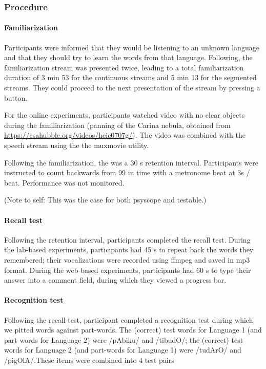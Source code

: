 \documentclass[]{article}
\let\oldparagraph\paragraph
\renewcommand{\paragraph}[1]{\oldparagraph{#1}\mbox{}}
\begin{document}
\subsubsection{Procedure}\label{procedure-1}

\paragraph{Familiarization}\label{familiarization}

Participants were informed that they would be listening to an unknown
language and that they should try to learn the words from that language.
Following, the familiarization stream was presented twice, leading to a
total familiarization duration of 3 min 53 for the continuous streams
and 5 min 13 for the segmented streams. They could proceed to the next
presentation of the stream by pressing a button.

For the online experiments, participants watched video with no clear
objects during the familiarization (panning of the Carina nebula,
obtained from \url{https://esahubble.org/videos/heic0707g/}). The video
was combined with the speech stream using the the muxmovie utility.

Following the familiarization, the was a 30 s retention interval.
Participants were instructed to count backwards from 99 in time with a
metronome beat at 3s / beat. Performance was not monitored.

(Note to self: This was the case for both psyscope and testable.)

\paragraph{Recall test}\label{recall-test}

Following the retention interval, participants completed the recall
test. During the lab-based experiments, participants had 45 s to repeat
back the words they remembered; their vocalizations were recorded using
ffmpeg and saved in mp3 format. During the web-based experiments,
participants had 60 s to type their answer into a comment field, during
which they viewed a progress bar.

\paragraph{Recognition test}\label{recognition-test}

Following the recall test, participant completed a recognition test
during which we pitted words against part-words. The (correct) test
words for Language 1 (and part-words for Language 2) were /pAbiku/ and
/tibudO/; the (correct) test words for Language 2 (and part-words for
Language 1) were /tudArO/ and /pigOlA/.These items were combined into 4
test pairs
\end{document}
